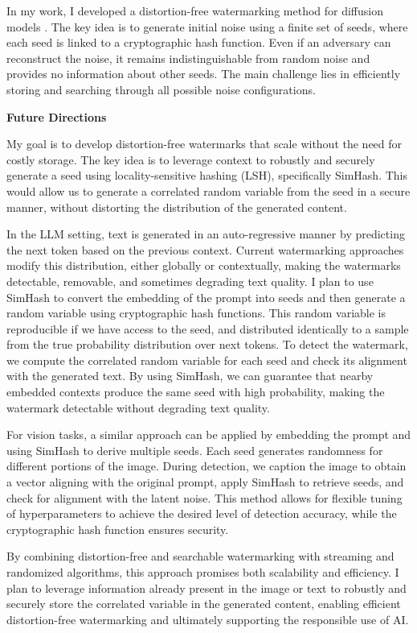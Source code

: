 \documentclass[11pt]{article}
\begin{document}
{In my work, I developed a distortion-free watermarking method for diffusion models \cite{arabi2024hidden}. The key idea is to generate initial noise using a finite set of seeds, where each seed is linked to a cryptographic hash function. Even if an adversary can reconstruct the noise, it remains indistinguishable from random noise and provides no information about other seeds. The main challenge lies in efficiently storing and searching through all possible noise configurations.

{ \large \textbf{Future Directions}}

My goal is to develop distortion-free watermarks that scale without the need for costly storage.
The key idea is to leverage context to robustly and securely generate a seed using locality-sensitive hashing (LSH), specifically SimHash.
This would allow us to generate a correlated random variable from the seed in a secure manner, without distorting the distribution of the generated content.

In the LLM setting, text is generated in an auto-regressive manner by predicting the next token based on the previous context. Current watermarking approaches modify this distribution, either globally or contextually, making the watermarks detectable, removable, and sometimes degrading text quality. I plan to use SimHash to convert the embedding of the prompt into seeds and then generate a random variable using cryptographic hash functions.  This random variable is reproducible if we have access to the seed, and distributed identically to a sample from the true probability distribution over next tokens. To detect the watermark, we compute the correlated random variable for each seed and check its alignment with the generated text. By using SimHash, we can guarantee that nearby embedded contexts produce the same seed with high probability, making the watermark detectable without degrading text quality.

For vision tasks, a similar approach can be applied by embedding the prompt and using SimHash to derive multiple seeds. Each seed generates randomness for different portions of the image. During detection, we caption the image to obtain a vector aligning with the original prompt, apply SimHash to retrieve seeds, and check for alignment with the latent noise. This method allows for flexible tuning of hyperparameters to achieve the desired level of detection accuracy, while the cryptographic hash function ensures security.

By combining distortion-free and searchable watermarking with streaming and randomized algorithms, this approach promises both scalability and efficiency. I plan to leverage information already present in the image or text to robustly and securely store the correlated variable in the generated content, enabling efficient distortion-free watermarking and ultimately supporting the responsible use of AI.

}
\end{document}
